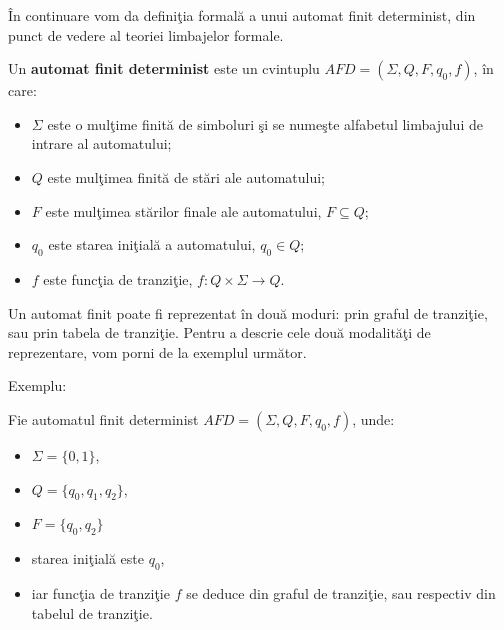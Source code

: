 În continuare vom da definiţia formală a unui automat finit determinist, din punct de vedere al teoriei limbajelor formale.

\begin{definitie}
Un \textbf{automat finit determinist} este un cvintuplu $AFD=(\Sigma, Q, F, q_{0}, f)$, în care:
\begin{itemize}
\item
$\Sigma$ este o mulţime finită de simboluri şi se numeşte alfabetul limbajului de intrare al automatului;
\item
$Q$ este mulţimea finită de stări ale automatului;
\item
$F$ este mulţimea stărilor finale ale automatului, $F \subseteq Q$;
\item
$q_{0}$ este starea iniţială a automatului, $q_{0} \in Q$;
\item
$f$ este funcţia de tranziţie, $f:Q \times \Sigma \rightarrow Q$.
\end{itemize}
\end{definitie}

Un automat finit poate fi reprezentat în două moduri: prin graful de tranziţie, sau prin tabela de tranziţie. Pentru a descrie cele două modalităţi de reprezentare, vom porni de la exemplul următor.

Exemplu:

Fie automatul finit determinist $AFD=(\Sigma, Q, F, q_{0}, f)$, unde:

\begin{itemize}
\item
$\Sigma = \{ 0, 1 \}$,
\item
$Q = \{ q_{0}, q_{1}, q_{2} \}$,
\item
$F=\{ q_{0}, q_{2} \}$
\item
starea iniţială este $q_{0}$,
\item
iar funcţia de tranziţie $f$ se deduce din graful de tranziţie, sau respectiv din tabelul de tranziţie.
\end{itemize}

